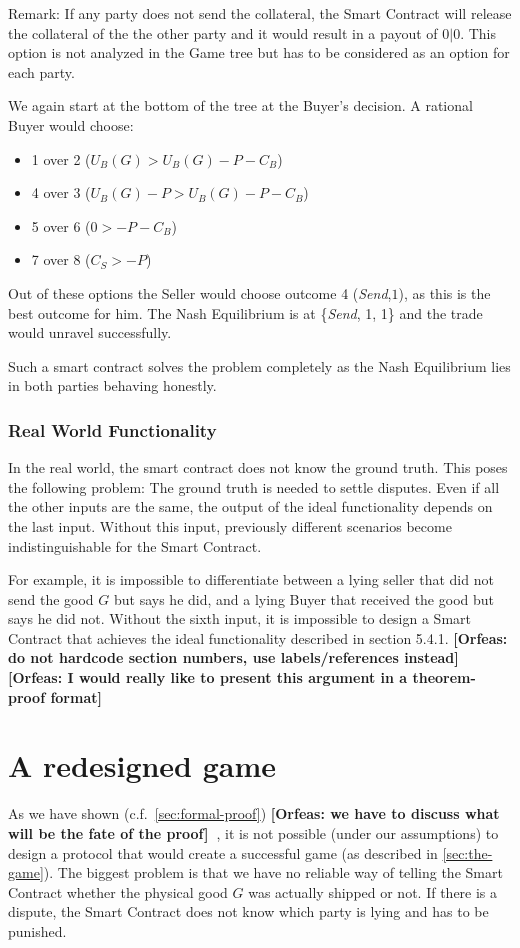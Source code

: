 \documentclass{cacthesis}
\newcommand{\authnote}[3]{{ \footnotesize \textbf{#1[#2: #3]~}}}
\newcommand{\orfnote}[1]{\authnote{\color{blue}}{Orfeas}{#1}}
\begin{document}
Remark: If any party does not send the collateral, the Smart Contract will release the collateral of the the other party and it would result in a payout of $0|0$. This option is not analyzed in the Game tree but has to be considered as an option for each party.\newline

We again start at the bottom of the tree at the Buyer's decision. A rational Buyer would choose: 
\begin{itemize}
    \item 1 over 2 ($U_B(G) > U_B(G) - P - C_B$)
    \item 4 over 3 ($U_B(G) - P > U_B(G) - P - C_B $)
    \item 5 over 6 ($0> -P-C_B$)
    \item 7 over 8 ($C_S > -P$)
\end{itemize}
Out of these options the Seller would choose outcome 4 (\emph{Send},$1$), as this is the best outcome for him.
The Nash Equilibrium is at \{\emph{Send}, 1, 1\} and the trade would unravel successfully.\newline

Such a smart contract solves the problem completely as the Nash Equilibrium lies in both parties behaving honestly.
\subsection{Real World Functionality}
In the real world, the smart contract does not know the ground truth.
This poses the following problem: The ground truth is needed to settle disputes. Even if all the other inputs are the same, the output of the ideal functionality depends on the last input. Without this input, previously different scenarios become indistinguishable for the Smart Contract.\newline

For example, it is impossible to differentiate between a lying seller that did not send the good $G$ but says he did, and a lying Buyer that received the good but says he did not. 
Without the sixth input, it is impossible to design a Smart Contract that achieves the ideal functionality described in section 5.4.1.
\orfnote{do not hardcode section numbers, use labels/references instead}
\orfnote{I would really like to present this argument in a theorem-proof format}

\chapter{A redesigned game}
As we have shown (c.f.~\ref{sec:formal-proof}) \orfnote{we have to discuss what will be the fate of the
proof}, it is not possible (under our assumptions) to design a protocol that would create a successful game (as described in \ref{sec:the-game}). The biggest problem is that we have no reliable way of telling the Smart Contract whether the physical good $G$ was actually shipped or not. If there is a dispute, the Smart Contract does not know which party is lying and has to be punished.\newline
\end{document}

